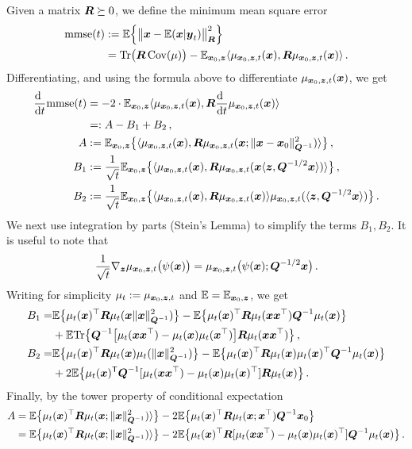 \documentclass[11pt]{article}
\numberwithin{equation}{section}
\theoremstyle{myremark}
\theoremstyle{myremark}
\theoremstyle{myexample}
\newcommand{\1}{\mathbf{1}}
\begin{document}
  Given a matrix $\bR\succeq 0$, we define the minimum mean square error
  \begin{align}
  \mmse(t) &:= \E\Big\{\big\|\bx-\E(\bx|\by_t)\big\|_{\bR}^2\Big\}\\
  & = \Tr\big(\bR\,\cov(\mu)\big)- \E_{\bx_0,\bz}\<\muc(\bx),\bR\muc(\bx)\>\, .
  \end{align}
  Differentiating, and using the formula above to differentiate $\muc(\bx)$,
  we get 
  \begin{align}
  \dert\mmse(t) & = -2 \cdot\E_{\bx_0,\bz}\<\muc(\bx),\bR\dert \muc(\bx)\> \\
  &=: A-B_1+B_2\, ,\label{eq:dtmmse}\\
  A&:= \E_{\bx_0,\bz} \big\{\<\muc(\bx),\bR\muc(\bx;\|\bx-\bx_0\|^2_{\bQ^{-1}})\>\big\}\, ,
  \\
  B_1 &:= \frac{1}{\sqrt{t}}\E_{\bx_0,\bz} \big\{\<\muc(\bx),\bR\muc(\bx\<\bz,\bQ^{-1/2}\bx\>)\>\big\}\, ,\\
  B_2 &:= \frac{1}{\sqrt{t}}\E_{\bx_0,\bz} \big\{\<\muc(\bx),\bR\muc(\bx)\>\muc(\<\bz,\bQ^{-1/2}\bx\>)\big\}\, .
  \end{align}
  We next use integration by parts (Stein's Lemma) to simplify the terms $B_1,B_2$.
  It is useful to note that
  \begin{align}
  \frac{1}{\sqrt{t}}\nabla_{\bz}\muc\big(\psi(\bx)\big) = \muc\big(\psi(\bx);\bQ^{-1/2}\bx\big)\, .
  \end{align}
  Writing for simplicity $\mus:=\muc$ and $\E=\E_{\bx_0,\bz}$, we get
   \begin{align}
  B_1=&\E\big\{\mus(\bx)^\top\bR\mus(\bx\|\bx\|^2_{\bQ^{-1}})\big\}  - \E \big\{\mus(\bx)^\top
  \bR \mus(\bx\bx^\top)\bQ^{-1}\mus(\bx)\big\}\label{eq:B1EQ}\\
  &+\E\Tr\big\{\bQ^{-1}\big[\mus(\bx\bx^\top)-\mus(\bx)\mus(\bx^\top)\big]
  \bR\mus(\bx\bx^\top)\big\}\, ,\nonumber\\
  B_2= & \E\big\{\mus(\bx)^\top\bR\mus(\bx)\mus(\|\bx\|_{\bQ^{-1}}^2)\big\}-
  \E\big\{\mus(\bx)^\top \bR\mus(\bx)\mus(\bx)^\top \bQ^{-1}\mus(\bx)\big\}\label{eq:B2EQ}\\
  &+2\E\big\{\mus(\bx)^{\sT}\bQ^{-1}[\mus(\bx\bx^\top)-\mus(\bx)\mus(\bx)^{\top}]\bR\mus(\bx)\big\}\, .
  \nonumber
   \end{align}
  Finally, by the tower property of conditional expectation
  \begin{align}
  A& = \E\big\{\mus(\bx)^\top\bR\mus(\bx;\|\bx\|^2_{\bQ^{-1}})\>\big\}-
  2\E \big\{\mus(\bx)^\top\bR\mus(\bx;\bx^{\top})\bQ^{-1}\bx_0\big\}\\
  & = \E\big\{\mus(\bx)^\top\bR\mus(\bx;\|\bx\|^2_{\bQ^{-1}})\>\big\}-
  2\E \big\{\mus(\bx)^\top\bR[\mus(\bx\bx^{\top})-\mus(\bx)\mus(\bx)^\top]\bQ^{-1}\mus(\bx)\big\}\, .
  \label{eq:AEQ}
  \end{align}
\end{document}
